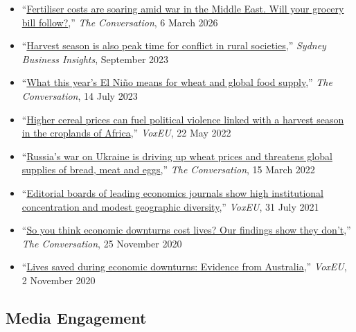 \documentclass[10pt]{article}
\begin{document}
	\begin{itemize}
		\item ``\href{https://theconversation.com/fertiliser-costs-are-soaring-amid-war-in-the-middle-east-will-your-grocery-bill-follow-277511}{Fertiliser costs are soaring amid war in the Middle East. Will your grocery bill follow?},'' \textit{The Conversation}, 6 March 2026
		\item ``\href{https://sbi.sydney.edu.au/harvest-season-is-also-peak-time-for-conflict-in-rural-societies}{Harvest season is also peak time for conflict in rural societies},'' \textit{Sydney Business Insights}, September 2023 
		\item ``\href{https://theconversation.com/what-this-years-el-nino-means-for-wheat-and-global-food-supply-209386}{What this year's El Niño means for wheat and global food supply},'' \textit{The Conversation}, 14 July 2023
		\item ``\href{https://voxeu.org/article/rising-cereal-prices-and-political-violence-croplands-africa}{Higher cereal prices can fuel political violence linked with a harvest season in the croplands of Africa},'' \textit{VoxEU}, 22 May 2022
		\item ``\href{https://theconversation.com/russias-war-on-ukraine-is-driving-up-wheat-prices-and-threatens-global-supplies-of-bread-meat-and-eggs-178879}{Russia’s war on Ukraine is driving up wheat prices and threatens global supplies of bread, meat and eggs},'' \textit{The Conversation}, 15 March 2022
		\item ``\href{https://voxeu.org/article/geographic-diversity-economics-journals-editorial-boards}{Editorial boards of leading economics journals show high institutional concentration and modest geographic diversity},'' \textit{VoxEU}, 31 July 2021
		\item ``\href{https://theconversation.com/so-you-think-economic-downturns-cost-lives-our-findings-show-they-dont-149711}{So you think economic downturns cost lives? Our findings show they don't},'' \textit{The Conversation}, 25 November 2020
		\item ``\href{https://voxeu.org/article/lives-saved-during-economic-downturns}{Lives saved during economic downturns: Evidence from Australia},'' \textit{VoxEU}, 2 November 2020
	\end{itemize}
	
	\subsection*{Media Engagement} 
	
\end{document}
